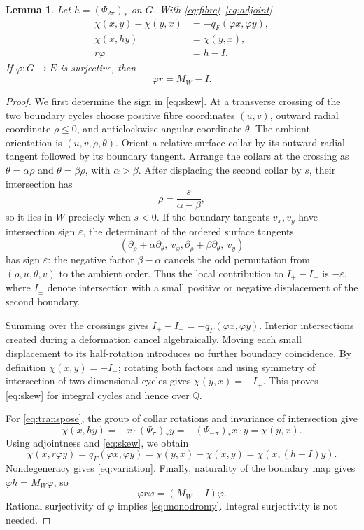 \documentclass[11pt]{article}
\newtheorem{lemma}[theorem]{Lemma}
\theoremstyle{definition}
\theoremstyle{remark}
\newcommand{\Q}{\mathbb Q}
\begin{document}
\begin{lemma}\label{lem:sign}
Let $h=(\Psi_{2\pi})_*$ on $G$. With \eqref{eq:fibre}--\eqref{eq:adjoint},
\begin{align}
\chi(x,y)-\chi(y,x)&=-q_F(\varphi x,\varphi y),\label{eq:skew}\\
\chi(x,hy)&=\chi(y,x),\label{eq:transpose}\\
r\varphi&=h-I.\label{eq:variation}
\end{align}
If $\varphi:G\to E$ is surjective, then
\begin{equation}\label{eq:monodromy}
\varphi r=M_W-I.
\end{equation}
\end{lemma}
\begin{proof}
We first determine the sign in \eqref{eq:skew}. At a transverse crossing of the two boundary cycles choose positive fibre coordinates $(u,v)$, outward radial coordinate $\rho\leq0$, and anticlockwise angular coordinate $\theta$. The ambient orientation is $(u,v,\rho,\theta)$. Orient a relative surface collar by its outward radial tangent followed by its boundary tangent. Arrange the collars at the crossing as $\theta=\alpha\rho$ and $\theta=\beta\rho$, with $\alpha>\beta$. After displacing the second collar by $s$, their intersection has
\[
\rho=\frac{s}{\alpha-\beta},
\]
so it lies in $W$ precisely when $s<0$. If the boundary tangents $v_x,v_y$ have intersection sign $\varepsilon$, the determinant of the ordered surface tangents
\[
(\partial_\rho+\alpha\partial_\theta,\ v_x,
  \partial_\rho+\beta\partial_\theta,\ v_y)
\]
has sign $\varepsilon$: the negative factor $\beta-\alpha$ cancels the odd permutation from $(\rho,u,\theta,v)$ to the ambient order. Thus the local contribution to $I_+-I_-$ is $-\varepsilon$, where $I_\pm$ denote intersection with a small positive or negative displacement of the second boundary.

Summing over the crossings gives $I_+-I_-=-q_F(\varphi x,\varphi y)$. Interior intersections created during a deformation cancel algebraically. Moving each small displacement to its half-rotation introduces no further boundary coincidence. By definition $\chi(x,y)=-I_-$; rotating both factors and using symmetry of intersection of two-dimensional cycles gives $\chi(y,x)=-I_+$. This proves \eqref{eq:skew} for integral cycles and hence over $\Q$.

For \eqref{eq:transpose}, the group of collar rotations and invariance of intersection give
\[
\chi(x,hy)=-x\cdot(\Psi_{\pi})_*y
=- (\Psi_{-\pi})_*x\cdot y=\chi(y,x).
\]
Using adjointness and \eqref{eq:skew}, we obtain
\[
\chi(x,r\varphi y)=q_F(\varphi x,\varphi y)
=\chi(y,x)-\chi(x,y)=\chi(x,(h-I)y).
\]
Nondegeneracy gives \eqref{eq:variation}. Finally, naturality of the boundary map gives $\varphi h=M_W\varphi$, so
\[
\varphi r\varphi=(M_W-I)\varphi.
\]
Rational surjectivity of $\varphi$ implies \eqref{eq:monodromy}. Integral surjectivity is not needed.
\end{proof}
\end{document}
